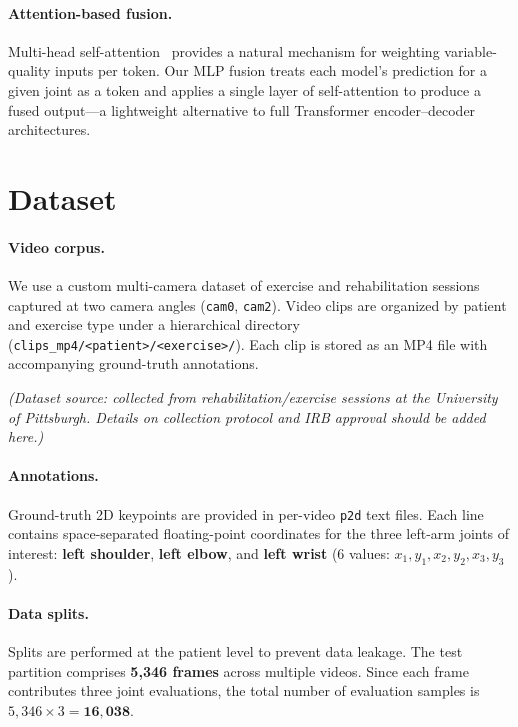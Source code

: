 \documentclass[11pt,a4paper]{article}
\begin{document}
\paragraph{Attention-based fusion.}
Multi-head self-attention~\cite{vaswani2017attention} provides a natural
mechanism for weighting variable-quality inputs per token.  Our MLP fusion
treats each model's prediction for a given joint as a token and applies a
single layer of self-attention to produce a fused output---a lightweight
alternative to full Transformer encoder--decoder architectures.

\section{Dataset}\label{sec:dataset}

\paragraph{Video corpus.}
We use a custom multi-camera dataset of exercise and rehabilitation sessions
captured at two camera angles (\texttt{cam0}, \texttt{cam2}).  Video clips are
organized by patient and exercise type under a hierarchical directory
(\texttt{clips\_mp4/<patient>/<exercise>/}).  Each clip is stored as an MP4
file with accompanying ground-truth annotations.

\textit{(Dataset source: collected from rehabilitation/exercise sessions at the
University of Pittsburgh.  Details on collection protocol and IRB approval
should be added here.)}

\paragraph{Annotations.}
Ground-truth 2D keypoints are provided in per-video \texttt{p2d} text files.
Each line contains space-separated floating-point coordinates for the three
left-arm joints of interest: \textbf{left shoulder}, \textbf{left elbow}, and
\textbf{left wrist} (6 values: $x_1, y_1, x_2, y_2, x_3, y_3$).

\paragraph{Data splits.}
Splits are performed at the patient level to prevent data leakage.  The test
partition comprises \textbf{5{,}346 frames} across multiple videos.  Since each
frame contributes three joint evaluations, the total number of evaluation
samples is $5{,}346 \times 3 = \mathbf{16{,}038}$.
\end{document}
